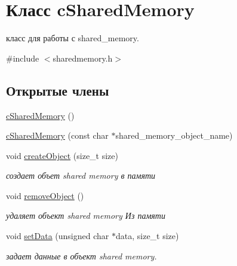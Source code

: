 \hypertarget{classc_shared_memory}{}\section{Класс c\+Shared\+Memory}
\label{classc_shared_memory}


класс для работы с shared\+\_\+memory.  




{\ttfamily \#include $<$sharedmemory.\+h$>$}

\subsection*{Открытые члены}
\begin{DoxyCompactItemize}
\item 
\hyperlink{classc_shared_memory_a7204cac49fd1f5d8581c6b448e2a67aa}{c\+Shared\+Memory} ()
\item 
\hyperlink{classc_shared_memory_ac9af9431ca45ead28b60b5913214fba5}{c\+Shared\+Memory} (const char $\ast$shared\+\_\+memory\+\_\+object\+\_\+name)
\item 
\mbox{\label{classc_shared_memory_a657f4819aec86246c27589d95a22ba47}} 
void \hyperlink{classc_shared_memory_a657f4819aec86246c27589d95a22ba47}{create\+Object} (size\+\_\+t size)
\begin{DoxyCompactList}\small\item\em создает объет shared memory в памяти \end{DoxyCompactList}\item 
void \hyperlink{classc_shared_memory_a1789ddec46e9e097d108ad69d188cd18}{remove\+Object} ()
\begin{DoxyCompactList}\small\item\em удаляет объект shared memory Из памяти \end{DoxyCompactList}\item 
\mbox{\label{classc_shared_memory_ac47d7c9f4071361aa37d919677fdfd77}} 
void \hyperlink{classc_shared_memory_ac47d7c9f4071361aa37d919677fdfd77}{set\+Data} (unsigned char $\ast$data, size\+\_\+t size)
\begin{DoxyCompactList}\small\item\em задает данные в объект shared memory. \end{DoxyCompactList}\end{DoxyCompactItemize}


